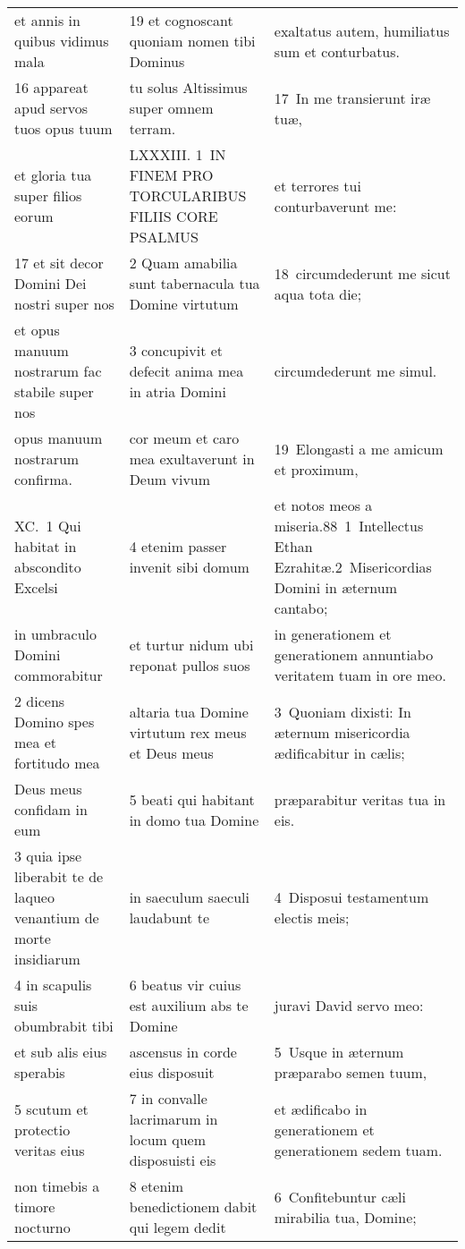 \documentclass{article}
\begin{document}
\begin{longtable}{@{}p{}p{}p{}@{}}
et annis in quibus vidimus mala	&	19 et cognoscant quoniam nomen tibi Dominus	&	exaltatus autem, humiliatus sum et conturbatus.	\\
16 appareat apud servos tuos opus tuum	&	tu solus Altissimus super omnem terram.	&	17 In me transierunt iræ tuæ,	\\
et gloria tua super filios eorum	&	LXXXIII. 1 IN FINEM PRO TORCULARIBUS FILIIS CORE PSALMUS	&	et terrores tui conturbaverunt me:	\\
17 et sit decor Domini Dei nostri super nos	&	2 Quam amabilia sunt tabernacula tua Domine virtutum	&	18 circumdederunt me sicut aqua tota die;	\\
et opus manuum nostrarum fac stabile super nos	&	3 concupivit et defecit anima mea in atria Domini	&	circumdederunt me simul.	\\
opus manuum nostrarum confirma.	&	cor meum et caro mea exultaverunt in Deum vivum	&	19 Elongasti a me amicum et proximum,	\\
XC. 1 Qui habitat in abscondito Excelsi	&	4 etenim passer invenit sibi domum	&	et notos meos a miseria.88 1 Intellectus Ethan Ezrahitæ.2 Misericordias Domini in æternum cantabo;	\\
in umbraculo Domini commorabitur	&	et turtur nidum ubi reponat pullos suos	&	in generationem et generationem annuntiabo veritatem tuam in ore meo.	\\
2 dicens Domino spes mea et fortitudo mea	&	altaria tua Domine virtutum rex meus et Deus meus	&	3 Quoniam dixisti: In æternum misericordia ædificabitur in cælis;	\\
Deus meus confidam in eum	&	5 beati qui habitant in domo tua Domine	&	præparabitur veritas tua in eis.	\\
3 quia ipse liberabit te de laqueo venantium de morte insidiarum	&	in saeculum saeculi laudabunt te	&	4 Disposui testamentum electis meis;	\\
4 in scapulis suis obumbrabit tibi	&	6 beatus vir cuius est auxilium abs te Domine	&	juravi David servo meo:	\\
et sub alis eius sperabis	&	ascensus in corde eius disposuit	&	5 Usque in æternum præparabo semen tuum,	\\
5 scutum et protectio veritas eius	&	7 in convalle lacrimarum in locum quem disposuisti eis	&	et ædificabo in generationem et generationem sedem tuam.	\\
non timebis a timore nocturno	&	8 etenim benedictionem dabit qui legem dedit	&	6 Confitebuntur cæli mirabilia tua, Domine;	\\

\end{longtable}
\end{document}
